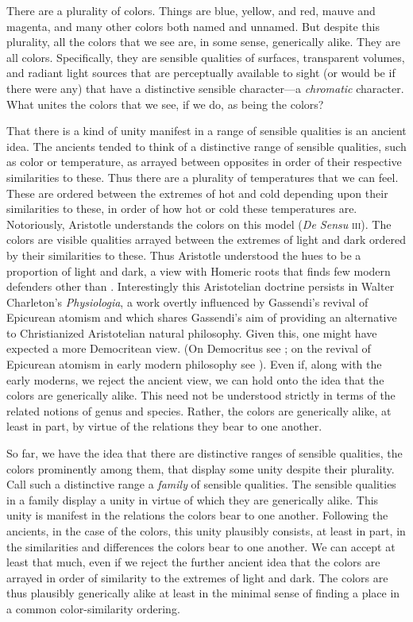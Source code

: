 \documentclass[12pt]{article}
\begin{document}

There are a plurality of colors. Things are blue, yellow, and red, mauve and magenta, and many other colors both named and unnamed. But despite this plurality, all the colors that we see are, in some sense, generically alike. They are all colors. Specifically, they are sensible qualities of surfaces, transparent volumes, and radiant light sources that are perceptually available to sight (or would be if there were any) that have a distinctive sensible character---a \emph{chromatic} character. What unites the colors that we see, if we do, as being the colors?

That there is a kind of unity manifest in a range of sensible qualities is an ancient idea. The ancients tended to think of a distinctive range of sensible qualities, such as color or temperature, as arrayed between opposites in order of their respective similarities to these. Thus there are a plurality of temperatures that we can feel. These are ordered between the extremes of hot and cold depending upon their similarities to these, in order of how hot or cold these temperatures are. Notoriously, Aristotle understands the colors on this model (\emph{De Sensu} \textsc{iii}). The colors are visible qualities arrayed between the extremes of light and dark ordered by their similarities to these. Thus Aristotle understood the hues to be a proportion of light and dark, a view with Homeric roots \citep{Gladstone:1858fk} that finds few modern defenders other than \citet{Goethe:1810uq}. Interestingly this Aristotelian doctrine persists in Walter Charleton's \citeyear{Charleton:1654fk} \emph{Physiologia}, a work overtly influenced by Gassendi's revival of Epicurean atomism and which shares Gassendi's aim of providing an alternative to Christianized Aristotelian natural philosophy. Given this, one might have expected a more Democritean view. (On Democritus see \citealt{Lee:2005qr,Pasnau:2007kx}; on the revival of Epicurean atomism in early modern philosophy see \citealt{Wilson:2008nr}). Even if, along with the early moderns, we reject the ancient view, we can hold onto the idea that the colors are generically alike. This need not be understood strictly in terms of the related notions of genus and species. Rather, the colors are generically alike, at least in part, by virtue of the relations they bear to one another. 

So far, we have the idea that there are distinctive ranges of sensible qualities, the colors prominently among them, that display some unity despite their plurality. Call such a distinctive range a \emph{family} of sensible qualities. The sensible qualities in a family display a unity in virtue of which they are generically alike. This unity is manifest in the relations the colors bear to one another. Following the ancients, in the case of the colors, this unity plausibly consists, at least in part, in the similarities and differences the colors bear to one another. We can accept at least that much, even if we reject the further ancient idea that the colors are arrayed in order of similarity to the extremes of light and dark. The colors are thus plausibly generically alike at least in the minimal sense of finding a place in a common color-similarity ordering. 
\end{document}

